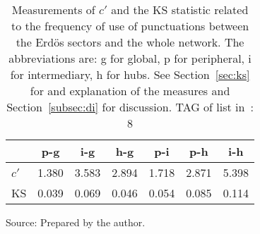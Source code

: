 \begin{table}[h!]
\begin{center}
	\caption{Measurements of $c'$ and the KS statistic related to the frequency of use of punctuations between the Erd\"os sectors and the whole network. The abbreviations are: g for global, p for peripheral, i for intermediary, h for hubs. See Section~\ref{sec:ks} for and explanation of the measures and Section~\ref{subsec:di} for discussion. TAG of list in~\cite{textTables}: 8}\label{tab:kolPct}
\begin{tabular}{| l || c | c | c | c | c | c |}\hline
{\bf } & {\bf p-g} & {\bf i-g} & {\bf h-g} & {\bf p-i} & {\bf p-h} & {\bf i-h} \\\hline\hline
$c'$ & 1.380  & 3.583  & 2.894  & 1.718  & 2.871  & 5.398 \\
KS & 0.039  & 0.069  & 0.046  & 0.054  & 0.085  & 0.114 \\\hline
\end{tabular}
\begin{flushleft}
Source: Prepared by the author.\
\end{flushleft}
\end{center}
\end{table}
